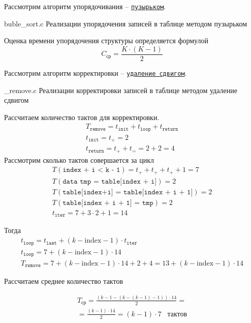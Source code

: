 \documentclass{bmstu}
\begin{document}
    Рассмотрим алгоритм упорядочивания -- \underline{\texttt{пузырьком}}.

        {buble_sort.c}
        {Реализации упорядочения записей в таблице методом пузырьком}

    Оценка времени упорядочения структуры определяется формулой 
    \[ C_{\texttt{ср}} = \frac{K \cdot (K - 1)}{2}\]

    Рассмотрим алгоритм корректировки -- \underline{\texttt{удаление сдвигом}}.
    
        {_remove.c}
        {Реализации корректировки записей в таблице методом удаление сдвигом}


    Рассчитаем количество тактов для корректировки.
    \begin{gather*}
        T_{\texttt{remove}} = t_{\texttt{init}} + t_{\texttt{loop}} + t_{\texttt{return}} \\
        t_{\texttt{init}} = t_{+} = 2 \\
        t_{\texttt{return}} = t_{+} + t_{=} = 2 + 2 = 4
    \end{gather*}
    Рассмотрим сколько тактов совершается за цикл
    \begin{gather*}
        T(\texttt{index + i < k - 1}) = t_{+} + t_{+} + t_{+} + 1 = 7 \\
        T(\texttt{data tmp = table[index + i]}) = 2 \\ 
        T(\texttt{table[index+i] = table[index + i + 1]}) = 2 \\
        T(\texttt{table[index + i + 1] = tmp}) = 2 \\
        t_{\texttt{iter}} = 7 + 3\cdot 2 + 1 = 14
    \end{gather*}

    Тогда
    \begin{gather*}
        t_{\texttt{loop}} = t_{\texttt{last}} + (k - \text{index} - 1)\cdot t_{\texttt{iter}} \\
        t_{\texttt{loop}} = 7 + (k - \text{index} - 1)\cdot 14 \\
        T_{\texttt{remove}} = 7 + (k - \text{index} - 1)\cdot 14 + 2 + 4 = 13 + (k - \text{index} - 1)\cdot 14
    \end{gather*}

    Рассчитаем среднее количество тактов

    \begin{gather*}
        T_{\text{ср}} = \frac{(k - 1 - (k - (k-1) - 1))\cdot 14}{2} = \\
        = \frac{(k-1)\cdot 14}{2} = (k-1)\cdot 7 \hspace{10pt} \text{тактов}
    \end{gather*}
\end{document}
